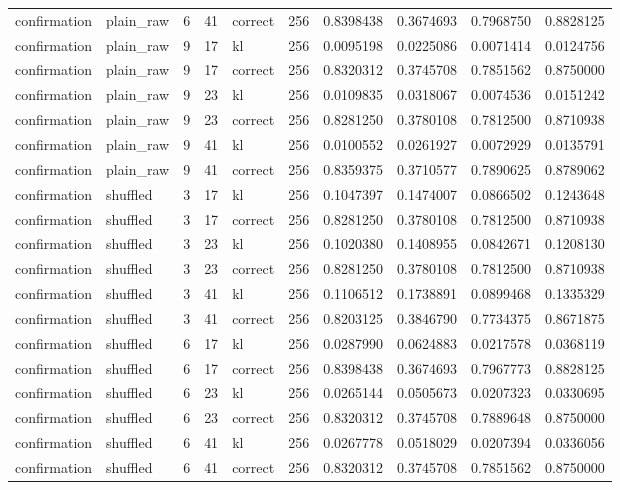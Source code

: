 \begin{tabular}{llrrlrrrrr}
confirmation & plain_raw & 6 & 41 & correct & 256 & 0.8398438 & 0.3674693 & 0.7968750 & 0.8828125 \\
confirmation & plain_raw & 9 & 17 & kl & 256 & 0.0095198 & 0.0225086 & 0.0071414 & 0.0124756 \\
confirmation & plain_raw & 9 & 17 & correct & 256 & 0.8320312 & 0.3745708 & 0.7851562 & 0.8750000 \\
confirmation & plain_raw & 9 & 23 & kl & 256 & 0.0109835 & 0.0318067 & 0.0074536 & 0.0151242 \\
confirmation & plain_raw & 9 & 23 & correct & 256 & 0.8281250 & 0.3780108 & 0.7812500 & 0.8710938 \\
confirmation & plain_raw & 9 & 41 & kl & 256 & 0.0100552 & 0.0261927 & 0.0072929 & 0.0135791 \\
confirmation & plain_raw & 9 & 41 & correct & 256 & 0.8359375 & 0.3710577 & 0.7890625 & 0.8789062 \\
confirmation & shuffled & 3 & 17 & kl & 256 & 0.1047397 & 0.1474007 & 0.0866502 & 0.1243648 \\
confirmation & shuffled & 3 & 17 & correct & 256 & 0.8281250 & 0.3780108 & 0.7812500 & 0.8710938 \\
confirmation & shuffled & 3 & 23 & kl & 256 & 0.1020380 & 0.1408955 & 0.0842671 & 0.1208130 \\
confirmation & shuffled & 3 & 23 & correct & 256 & 0.8281250 & 0.3780108 & 0.7812500 & 0.8710938 \\
confirmation & shuffled & 3 & 41 & kl & 256 & 0.1106512 & 0.1738891 & 0.0899468 & 0.1335329 \\
confirmation & shuffled & 3 & 41 & correct & 256 & 0.8203125 & 0.3846790 & 0.7734375 & 0.8671875 \\
confirmation & shuffled & 6 & 17 & kl & 256 & 0.0287990 & 0.0624883 & 0.0217578 & 0.0368119 \\
confirmation & shuffled & 6 & 17 & correct & 256 & 0.8398438 & 0.3674693 & 0.7967773 & 0.8828125 \\
confirmation & shuffled & 6 & 23 & kl & 256 & 0.0265144 & 0.0505673 & 0.0207323 & 0.0330695 \\
confirmation & shuffled & 6 & 23 & correct & 256 & 0.8320312 & 0.3745708 & 0.7889648 & 0.8750000 \\
confirmation & shuffled & 6 & 41 & kl & 256 & 0.0267778 & 0.0518029 & 0.0207394 & 0.0336056 \\
confirmation & shuffled & 6 & 41 & correct & 256 & 0.8320312 & 0.3745708 & 0.7851562 & 0.8750000 \\

\end{tabular}
